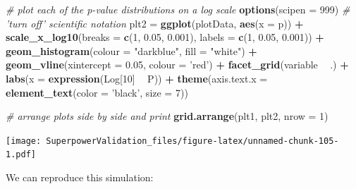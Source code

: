 \documentclass[
]{book}
\newenvironment{Shaded}{\begin{snugshade}}{\end{snugshade}}
\newcommand{\CommentTok}[1]{\textcolor[rgb]{0.56,0.35,0.01}{\textit{#1}}}
\newcommand{\DataTypeTok}[1]{\textcolor[rgb]{0.13,0.29,0.53}{#1}}
\newcommand{\DecValTok}[1]{\textcolor[rgb]{0.00,0.00,0.81}{#1}}
\newcommand{\FloatTok}[1]{\textcolor[rgb]{0.00,0.00,0.81}{#1}}
\newcommand{\KeywordTok}[1]{\textcolor[rgb]{0.13,0.29,0.53}{\textbf{#1}}}
\newcommand{\NormalTok}[1]{#1}
\newcommand{\OperatorTok}[1]{\textcolor[rgb]{0.81,0.36,0.00}{\textbf{#1}}}
\newcommand{\StringTok}[1]{\textcolor[rgb]{0.31,0.60,0.02}{#1}}
\begin{document}
\begin{Shaded}
\begin{Highlighting}[]
\CommentTok{# plot each of the p-value distributions on a log scale}
\KeywordTok{options}\NormalTok{(}\DataTypeTok{scipen =} \DecValTok{999}\NormalTok{) }\CommentTok{# 'turn off' scientific notation}
\NormalTok{plt2 =}\StringTok{ }\KeywordTok{ggplot}\NormalTok{(plotData, }\KeywordTok{aes}\NormalTok{(}\DataTypeTok{x =}\NormalTok{ p)) }\OperatorTok{+}
\KeywordTok{scale_x_log10}\NormalTok{(}\DataTypeTok{breaks =} \KeywordTok{c}\NormalTok{(}\DecValTok{1}\NormalTok{, }\FloatTok{0.05}\NormalTok{, }\FloatTok{0.001}\NormalTok{),}
\DataTypeTok{labels =} \KeywordTok{c}\NormalTok{(}\DecValTok{1}\NormalTok{, }\FloatTok{0.05}\NormalTok{, }\FloatTok{0.001}\NormalTok{)) }\OperatorTok{+}
\KeywordTok{geom_histogram}\NormalTok{(}\DataTypeTok{colour =} \StringTok{"darkblue"}\NormalTok{, }\DataTypeTok{fill =} \StringTok{"white"}\NormalTok{) }\OperatorTok{+}
\KeywordTok{geom_vline}\NormalTok{(}\DataTypeTok{xintercept =} \FloatTok{0.05}\NormalTok{, }\DataTypeTok{colour =} \StringTok{'red'}\NormalTok{) }\OperatorTok{+}
\KeywordTok{facet_grid}\NormalTok{(variable }\OperatorTok{~}\StringTok{ }\NormalTok{.) }\OperatorTok{+}
\KeywordTok{labs}\NormalTok{(}\DataTypeTok{x =} \KeywordTok{expression}\NormalTok{(Log[}\DecValTok{10}\NormalTok{] }\OperatorTok{~}\StringTok{ }\NormalTok{P)) }\OperatorTok{+}
\KeywordTok{theme}\NormalTok{(}\DataTypeTok{axis.text.x =} \KeywordTok{element_text}\NormalTok{(}\DataTypeTok{color =} \StringTok{'black'}\NormalTok{, }\DataTypeTok{size =} \DecValTok{7}\NormalTok{))}

\CommentTok{# arrange plots side by side and print}
\KeywordTok{grid.arrange}\NormalTok{(plt1, plt2, }\DataTypeTok{nrow =} \DecValTok{1}\NormalTok{)}
\end{Highlighting}
\end{Shaded}

\texttt{[image: SuperpowerValidation\_files/figure-latex/unnamed-chunk-105-1.pdf]}

We can reproduce this simulation:
\end{document}
